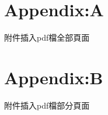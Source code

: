 \appendix
\label{app:appendix}
\section{Appendix:A}
附件插入pdf檔全部頁面


\section{Appendix:B}
附件插入pdf檔部分頁面
